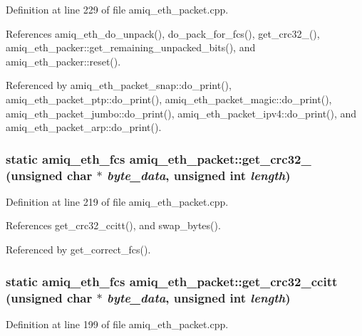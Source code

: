 Definition at line 229 of file amiq\_\-eth\_\-packet.cpp.

References amiq\_\-eth\_\-do\_\-unpack(), do\_\-pack\_\-for\_\-fcs(), get\_\-crc32\_(), amiq\_\-eth\_\-packer::get\_\-remaining\_\-unpacked\_\-bits(), and amiq\_\-eth\_\-packer::reset().

Referenced by amiq\_\-eth\_\-packet\_\-snap::do\_\-print(), amiq\_\-eth\_\-packet\_\-ptp::do\_\-print(), amiq\_\-eth\_\-packet\_\-magic::do\_\-print(), amiq\_\-eth\_\-packet\_\-jumbo::do\_\-print(), amiq\_\-eth\_\-packet\_\-ipv4::do\_\-print(), and amiq\_\-eth\_\-packet\_\-arp::do\_\-print().\hypertarget{classamiq__eth__packet_a52f95dacb2ead62a53d11491b8b3f445}{
\subsubsection[{get\_\-crc32\_\-802}]{\setlength{\rightskip}{0pt plus 5cm}static {\bf amiq\_\-eth\_\-fcs} amiq\_\-eth\_\-packet::get\_\-crc32\_ (unsigned char $\ast$ {\em byte\_\-data}, \/  unsigned int {\em length})}}
\label{classamiq__eth__packet_a52f95dacb2ead62a53d11491b8b3f445}


Definition at line 219 of file amiq\_\-eth\_\-packet.cpp.

References get\_\-crc32\_\-ccitt(), and swap\_\-bytes().

Referenced by get\_\-correct\_\-fcs().\hypertarget{classamiq__eth__packet_a873819b36fc796deb1e97bd7d18d4a67}{
\subsubsection[{get\_\-crc32\_\-ccitt}]{\setlength{\rightskip}{0pt plus 5cm}static {\bf amiq\_\-eth\_\-fcs} amiq\_\-eth\_\-packet::get\_\-crc32\_\-ccitt (unsigned char $\ast$ {\em byte\_\-data}, \/  unsigned int {\em length})}}
\label{classamiq__eth__packet_a873819b36fc796deb1e97bd7d18d4a67}


Definition at line 199 of file amiq\_\-eth\_\-packet.cpp.

